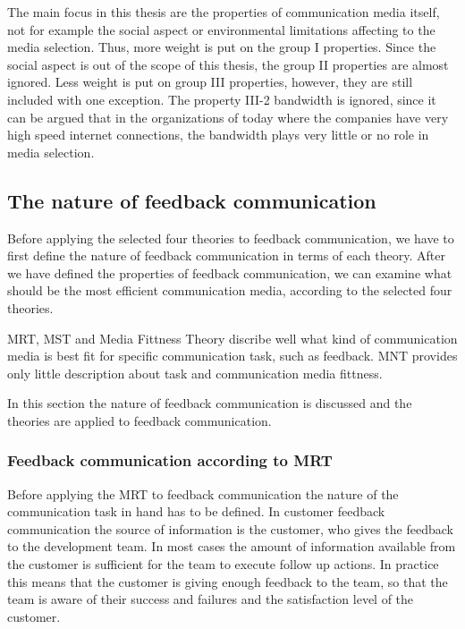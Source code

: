 \documentclass[english,12pt,a4paper,pdftex]{article}
\begin{document}
The main focus in this thesis are the properties of communication media itself, not for example the social aspect or environmental limitations affecting to the media selection. Thus, more weight is put on the group I properties. Since the social aspect is out of the scope of this thesis, the group II properties are almost ignored. Less weight is put on group III properties, however, they are still included with one exception. The property III-2 bandwidth is ignored, since it can be argued that in the organizations of today where the companies have very high speed internet connections, the bandwidth plays very little or no role in media selection.

\subsection{The nature of feedback communication}

Before applying the selected four theories to feedback communication, we have to first define the nature of feedback communication in terms of each theory. After we have defined the properties of feedback communication, we can examine what should be the most efficient communication media, according to the selected four theories.

\Ac{MRT}, \ac{MST} and Media Fittness Theory discribe well what kind of communication media is best fit for specific communication task, such as feedback. \Ac{MNT} provides only little description about task and communication media fittness.

In this section the nature of feedback communication is discussed and the theories are applied to feedback communication.


\subsubsection{Feedback communication according to MRT}

Before applying the \ac{MRT} to feedback communication the nature of the communication task in hand has to be defined. In customer feedback communication the source of information is the customer, who gives the feedback to the development team. In most cases the amount of information available from the customer is sufficient for the team to execute follow up actions. In practice this means that the customer is giving enough feedback to the team, so that the team is aware of their success and failures and the satisfaction level of the customer.
\end{document}
